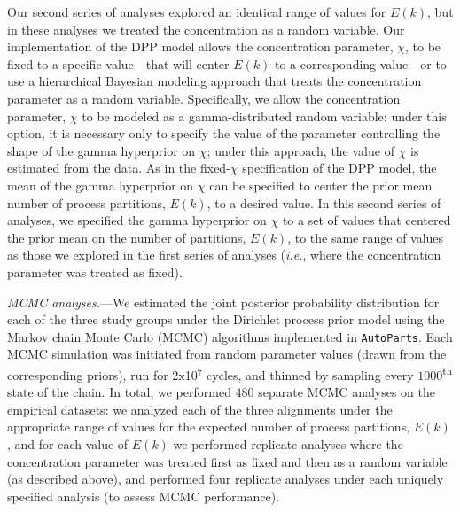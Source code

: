 \documentclass[11pt]{article}
\begin{document}
Our second series of analyses explored an identical range of values for $E(k)$, but in these analyses we treated the concentration as a random variable.
Our implementation of the DPP model allows the concentration parameter, $\chi$, to be fixed to a specific value---that will center $E(k)$ to a corresponding value---or to use a hierarchical Bayesian modeling approach that treats the concentration parameter as a random variable.
Specifically, we allow the concentration parameter, $\chi$ to be modeled as a gamma-distributed random variable: under this option, it is necessary only to specify the value of the parameter controlling the shape of the gamma hyperprior on $\chi$; under this approach, the value of $\chi$ is estimated from the data.
As in the fixed-$\chi$ specification of the DPP model, the mean of the gamma hyperprior on $\chi$ can be specified to center the prior mean number of process partitions, $E(k)$, to a desired value.
In this second series of analyses, we specified the gamma hyperprior on $\chi$ to a set of values that centered the prior mean on the number of partitions, $E(k)$, to the same range of values as those we explored in the first series of analyses ({\it i.e.}, where the concentration parameter was treated as fixed).

\bigskip
\noindent
{\it MCMC analyses.}---We estimated the joint posterior probability distribution for each of the three study groups under the Dirichlet process prior model using the Markov chain Monte Carlo (MCMC) algorithms implemented in \verb!AutoParts!.
Each MCMC simulation was initiated from random parameter values (drawn from the corresponding priors), run for 2x10$^7$ cycles, and thinned by sampling every $1000$\textsuperscript{th} state of the chain.
In total, we performed $480$ separate MCMC analyses on the empirical datasets: we analyzed each of the three alignments under the appropriate range of values for the expected number of process partitions, $E(k)$, and for each value of $E(k)$ we performed replicate analyses where the concentration parameter was treated first as fixed and then as a random variable (as described above), and performed four replicate analyses under each uniquely specified analysis (to assess MCMC performance).  
\end{document}
